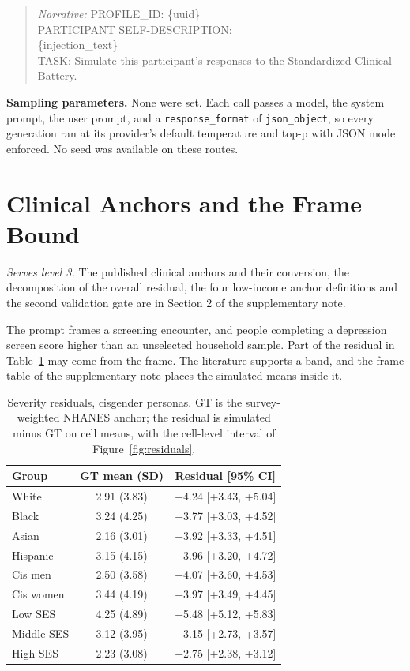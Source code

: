 \documentclass[wcp]{jmlr}
\begin{document}
\begin{quote}\small
\textit{Narrative:} PROFILE\_ID: \{uuid\} \\
PARTICIPANT SELF-DESCRIPTION: \\
\{injection\_text\} \\[2pt]
TASK: Simulate this participant's responses to the Standardized Clinical Battery.
\end{quote}

\textbf{Sampling parameters.} None were set. Each call passes a model, the system prompt, the user prompt, and a \texttt{response\_\allowbreak format} of \texttt{json\_\allowbreak object}, so every generation ran at its provider's default temperature and top-p with JSON mode enforced. No seed was available on these routes.

\section{Clinical Anchors and the Frame Bound}
\label{app:anchors}
\noindent\emph{Serves level 3.} The published clinical anchors and their conversion, the
decomposition of the overall residual, the four low-income anchor definitions and the second
validation gate are in Section 2 of the supplementary note.

The prompt frames a screening encounter, and people completing a depression screen score higher than an unselected household sample. Part of the residual in Table~\ref{tab:residuals} may come from the frame. The literature supports a band, and the frame table of the supplementary note places the simulated means inside it.

\begin{table}[!htb]
\centering
\caption{Severity residuals, cisgender personas. GT is the survey-weighted NHANES anchor; the residual is simulated minus GT on cell means, with the cell-level interval of Figure~\ref{fig:residuals}.}
\label{tab:residuals}
\small
\setlength{\tabcolsep}{5pt}
\begin{tabular}{lcc}
\toprule
Group & GT mean (SD) & Residual [95\% CI] \\
\midrule
White & 2.91 (3.83) & +4.24 [+3.43, +5.04] \\
Black & 3.24 (4.25) & +3.77 [+3.03, +4.52] \\
Asian & 2.16 (3.01) & +3.92 [+3.33, +4.51] \\
Hispanic & 3.15 (4.15) & +3.96 [+3.20, +4.72] \\
Cis men & 2.50 (3.58) & +4.07 [+3.60, +4.53] \\
Cis women & 3.44 (4.19) & +3.97 [+3.49, +4.45] \\
Low SES & 4.25 (4.89) & +5.48 [+5.12, +5.83] \\
Middle SES & 3.12 (3.95) & +3.15 [+2.73, +3.57] \\
High SES & 2.23 (3.08) & +2.75 [+2.38, +3.12] \\
\bottomrule
\end{tabular}
\end{table}
\end{document}
